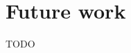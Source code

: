 \chapter{Future work}\label{ch:futwork} TODO
\begin{comment}
{\bf {\it MOVED FROM ICFP paper}}
The motivation for this investigation is the design of Trellys, a
full-featured language with dependent types being developed by a
cooperative project of Portland State University, the University of Iowa,
and the University of Pennsylvania. A design goal of Trellys is to develop
an inference mechanism which determines what terms of the language are safe
to use as a logic, and what terms can only be used as programs. We call
this analysis {\em logicality inference}. The intent is that logical values
can be interpreted as proof objects by a Curry-Howard style interpretation,
while programmatic values are allowed to express arbitrary computations
(including non-termination). The usability of Trellys requires that it be
as expressive as possible over natural forms of inductive and recursive
argument.  Hence our motivation to fully understand the Mendler-style
recursion combinators. It is our intention that the three conventions
discussed in the previous paragraph will be enforced in the Trellys system, and
our use of Haskell to illustrate the Mendler style, will soon be unnecessary.
\end{comment}

